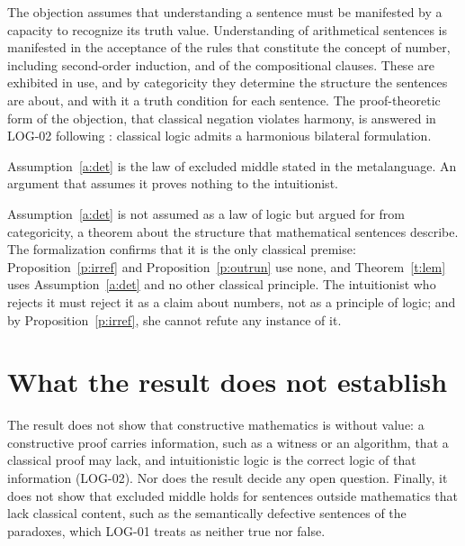 \documentclass{situationist-preprint}
\begin{document}
\begin{reply}
The objection assumes that understanding a sentence must be manifested by a capacity to recognize its truth value. Understanding of arithmetical sentences is manifested in the acceptance of the rules that constitute the concept of number, including second-order induction, and of the compositional clauses. These are exhibited in use, and by categoricity they determine the structure the sentences are about, and with it a truth condition for each sentence. The proof-theoretic form of the objection, that classical negation violates harmony, is answered in LOG-02 following \citet{Rumfitt2000}: classical logic admits a harmonious bilateral formulation.
\end{reply}

\begin{objection}
Assumption~\ref{a:det} is the law of excluded middle stated in the metalanguage. An argument that assumes it proves nothing to the intuitionist.
\end{objection}

\begin{reply}
Assumption~\ref{a:det} is not assumed as a law of logic but argued for from categoricity, a theorem about the structure that mathematical sentences describe. The formalization confirms that it is the only classical premise: Proposition~\ref{p:irref} and Proposition~\ref{p:outrun} use none, and Theorem~\ref{t:lem} uses Assumption~\ref{a:det} and no other classical principle. The intuitionist who rejects it must reject it as a claim about numbers, not as a principle of logic; and by Proposition~\ref{p:irref}, she cannot refute any instance of it.
\end{reply}

\section{What the result does not establish}

The result does not show that constructive mathematics is without value: a constructive proof carries information, such as a witness or an algorithm, that a classical proof may lack, and intuitionistic logic is the correct logic of that information (LOG-02). Nor does the result decide any open question. Finally, it does not show that excluded middle holds for sentences outside mathematics that lack classical content, such as the semantically defective sentences of the paradoxes, which LOG-01 treats as neither true nor false.
\end{document}
